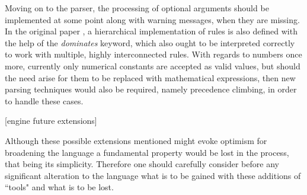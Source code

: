 Moving on to the parser, the processing of optional arguments should be implemented at some point along with warning messages, when they are missing. In the original paper \cite{pillerkovacs2015}, a hierarchical implementation of rules is also defined with the help of the \textit{dominates} keyword, which also ought to be interpreted correctly to work with multiple, highly interconnected rules. With regards to numbers once more, currently only numerical constants are accepted as valid values, but should the need arise for them to be replaced with mathematical expressions, then new parsing techniques would also be required, namely precedence climbing, in order to handle these cases.

[engine future extensions]

Although these possible extensions mentioned might evoke optimism for broadening the language a fundamental property would be lost in the process, that being its simplicity. Therefore one should carefully consider before any significant alteration to the language what is to be gained with these additions of ``tools" and what is to be lost.